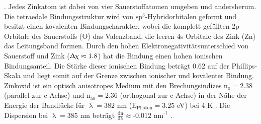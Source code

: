 \cite{Klingshirn.2010}. Jedes Zinkatom ist dabei von vier Sauerstoffatomen
\mbox{umgeben} und andersherum. Die tetraedale Bindungsstruktur wird von
$\text{sp}^\text{3}$-Hybridorbitalen \mbox{geformt} und besitzt einen kovalenten
Bindungscharakter, wobei die komplett \mbox{gefüllten} \mbox{2p-Orbitale} des
Sauerstoffs (O) das Valenzband, die leeren 4s-Orbitale des Zink (Zn) das
Leitungsband formen. Durch den hohen Elektronegativitätsunterschied  von
\mbox{Sauerstoff} und Zink ($\Updelta\upchi\approx \text{1.8}$) hat die Bindung
einen hohen ionischen Bindungsanteil. Die Stärke dieser ionischen Bindung
beträgt 0.62 auf der Phillips-Skala \cite{Ivanov.1981} und liegt somit auf der
Grenze zwischen ionischer und kovalenter Bindung.  Zinkoxid ist ein optisch
anisotropes Medium mit den Brechungsindizes $\text{n}_\text{o}= \text{2.38}$
(parallel zur c-Achse) und $\text{n}_\text{ao}= \text{2.36}$ (orthogonal zur
c-Achse) in der Nähe der Energie der Bandlücke für $\uplambda= \text{382}$ nm
($\text{E}_\text{Photon}= \text{3.25}$ eV) bei 4 K \cite{Park.1968}. Die
Dispersion bei $\uplambda=\text{385 nm}$ beträgt $\frac{\text{dn}}{\text{d}
\uplambda} \approx \text{-0.012 nm}^\text{-1}$ \cite{Zimmler.2010}.
